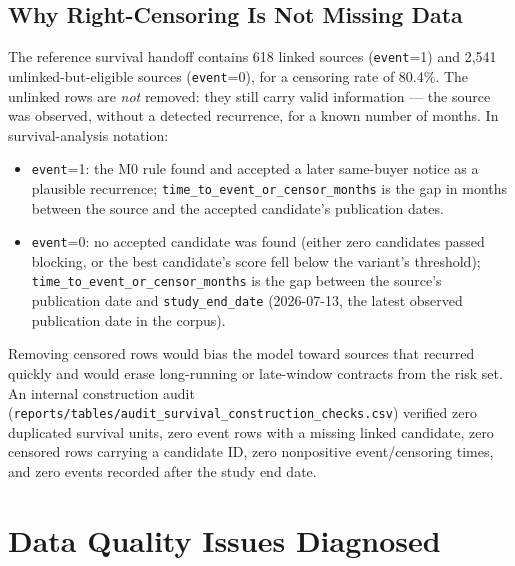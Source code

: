 \documentclass[11pt]{article}
\begin{document}
\subsection{Why Right-Censoring Is Not Missing Data}
The reference survival handoff contains 618 linked sources
(\texttt{event}=1) and 2{,}541 unlinked-but-eligible sources
(\texttt{event}=0), for a censoring rate of 80.4\%. The unlinked rows are
\emph{not} removed: they still carry valid information --- the source was
observed, without a detected recurrence, for a known number of months. In
survival-analysis notation:
\begin{itemize}
  \item \texttt{event}=1: the M0 rule found and accepted a later same-buyer
  notice as a plausible recurrence; \texttt{time\_to\_event\_or\_censor\_months}
  is the gap in months between the source and the accepted candidate's
  publication dates.
  \item \texttt{event}=0: no accepted candidate was found (either zero
  candidates passed blocking, or the best candidate's score fell below the
  variant's threshold); \texttt{time\_to\_event\_or\_censor\_months} is the
  gap between the source's publication date and \texttt{study\_end\_date}
  (2026-07-13, the latest observed publication date in the corpus).
\end{itemize}
Removing censored rows would bias the model toward sources that recurred
quickly and would erase long-running or late-window contracts from the risk
set. An internal construction audit
(\texttt{reports/tables/audit\_survival\_construction\_checks.csv}) verified
zero duplicated survival units, zero event rows with a missing linked
candidate, zero censored rows carrying a candidate ID, zero nonpositive
event/censoring times, and zero events recorded after the study end date.

\section{Data Quality Issues Diagnosed}
\label{sec:dq}
\end{document}
